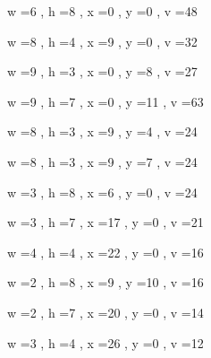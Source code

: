 \documentclass[11pt]{article}
\begin{document}
w =6 , h =8 , x =0 , y =0 , v =48
\par
w =8 , h =4 , x =9 , y =0 , v =32
\par
w =9 , h =3 , x =0 , y =8 , v =27
\par
w =9 , h =7 , x =0 , y =11 , v =63
\par
w =8 , h =3 , x =9 , y =4 , v =24
\par
w =8 , h =3 , x =9 , y =7 , v =24
\par
w =3 , h =8 , x =6 , y =0 , v =24
\par
w =3 , h =7 , x =17 , y =0 , v =21
\par
w =4 , h =4 , x =22 , y =0 , v =16
\par
w =2 , h =8 , x =9 , y =10 , v =16
\par
w =2 , h =7 , x =20 , y =0 , v =14
\par
w =3 , h =4 , x =26 , y =0 , v =12
\par
\newpage
\end{document}
